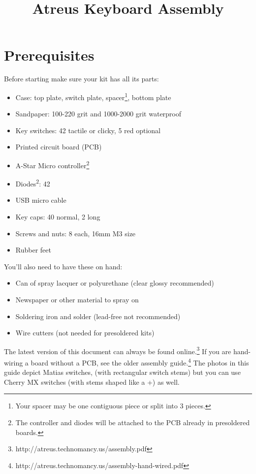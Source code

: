 \documentclass[landscape,twocolumn]{article}
\title{Atreus Keyboard Assembly}
\date{ }
\begin{document}
\setlength{\parindent}{0cm}
\maketitle
\section{Prerequisites}

Before starting make sure your kit has all its parts:

\begin{itemize}
\item Case: top plate, switch plate, spacer\footnote{Your spacer may
  be one contiguous piece or split into 3 pieces.}, bottom plate
\item Sandpaper: 100-220 grit and 1000-2000 grit waterproof
\item Key switches: 42 tactile or clicky, 5 red optional
\item Printed circuit board (PCB)
\item A-Star Micro controller\footnote{The controller and diodes will be
  attached to the PCB already in presoldered boards.}
\item Diodes\textsuperscript{2}: 42
\item USB micro cable
\item Key caps: 40 normal, 2 long
\item Screws and nuts: 8 each, 16mm M3 size
\item Rubber feet
\end{itemize}

You'll also need to have these on hand:

\begin{itemize}
\item Can of spray lacquer or polyurethane (clear glossy recommended)
\item Newspaper or other material to spray on
\item Soldering iron and solder (lead-free not recommended)
\item Wire cutters (not needed for presoldered kits)
\end{itemize}

\vspace{1em}

The latest version of this document can always be found
online.\footnote{http://atreus.technomancy.us/assembly.pdf} If you are
hand-wiring a board without a PCB, see the older assembly
guide.\footnote{http://atreus.technomancy.us/assembly-hand-wired.pdf}
The photos in this guide depict Matias switches, (with rectangular
switch stems) but you can use Cherry MX switches (with stems shaped
like a +) as well.
\end{document}
